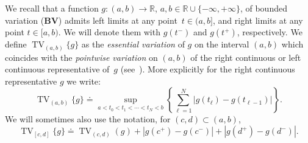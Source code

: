 \documentclass[a4paper, 10pt, final]{article}
\newcommand{\R}{\mathbb{R}} \newcommand{\N}{\mathbb{N}}
\newcommand{\maurotx}[1]{{\color{blue} [Mauro]: {#1}}}
\DeclareMathOperator{\tv}{TV}
\begin{document}
We recall that a function $g: (a,b)\to \R$, $a,b\in \R\cup\{-\infty,+\infty\}$, of bounded variation ($\mathbf{BV}$) 
admits  left limits at any point~$t\in (a,b]$, 
and right limits at any point $t\in[a,b)$.
We will denote them with $g(t^-)$
and $g(t^+)$, respectively.
We  
define $\tv_{(a, b)}\{g\}$ as the 
{\it essential variation} of $g$ on the  interval $(a,b)$ 
which coincides with the {\it pointwise variation} on $(a,b)$
of the right continuous or left continuous representative of~$g$
(see~\cite[Section 3.2]{AFP}). 
More explicitly for the right continuous representative $g$ we write:    
\begin{equation}
  \label{tv}
  \tv_{(a,b)}\{g\}\doteq \sup_{a< t_0<t_1<\cdots<t_N<  b}
  \left\{\sum_{\ell=1}^N |g(t_\ell) - g(t_{\ell-1})|\right\}.
\end{equation}
We will sometimes also use the notation, for $(c,d)\subset (a,b)$, 
\begin{equation}
  \label{tvchiusa}
  \tv_{[c,d]}\{g\}\doteq  \tv_{(c,d)}(g)+ |g(c^+)-g(c^-)|+|g(d^+)-g(d^-)|.
\end{equation}

 
 
\end{document}
